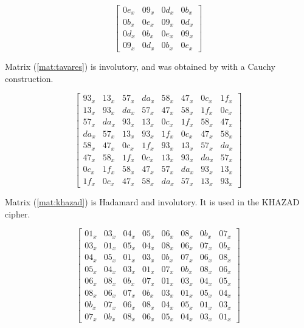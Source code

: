 \documentclass{report}
\begin{document}
\begin{equation}\label{mat:square-inv}
\begin{bmatrix}
0e_x & 09_x & 0d_x & 0b_x\\
0b_x & 0e_x & 09_x & 0d_x\\
0d_x & 0b_x & 0e_x & 09_x\\
09_x & 0d_x & 0b_x & 0e_x
\end{bmatrix}
\end{equation}

Matrix (\ref{mat:tavares}) is involutory, and was obtained by \cite{Youssef1997} with a Cauchy construction.

\begin{equation}\label{mat:tavares}
\begin{bmatrix}
93_x & 13_x & 57_x & da_x & 58_x & 47_x & 0c_x & 1f_x\\
13_x & 93_x & da_x & 57_x & 47_x & 58_x & 1f_x & 0c_x\\
57_x & da_x & 93_x & 13_x & 0c_x & 1f_x & 58_x & 47_x\\
da_x & 57_x & 13_x & 93_x & 1f_x & 0c_x & 47_x & 58_x\\
58_x & 47_x & 0c_x & 1f_x & 93_x & 13_x & 57_x & da_x\\
47_x & 58_x & 1f_x & 0c_x & 13_x & 93_x & da_x & 57_x\\
0c_x & 1f_x & 58_x & 47_x & 57_x & da_x & 93_x & 13_x\\
1f_x & 0c_x & 47_x & 58_x & da_x & 57_x & 13_x & 93_x
\end{bmatrix}
\end{equation}

Matrix (\ref{mat:khazad}) is Hadamard and involutory. It is used in the KHAZAD \cite{KHAZAD2000} cipher.

\begin{equation}\label{mat:khazad}
\begin{bmatrix}
01_x & 03_x & 04_x & 05_x & 06_x & 08_x & 0b_x & 07_x\\
03_x & 01_x & 05_x & 04_x & 08_x & 06_x & 07_x & 0b_x\\
04_x & 05_x & 01_x & 03_x & 0b_x & 07_x & 06_x & 08_x\\
05_x & 04_x & 03_x & 01_x & 07_x & 0b_x & 08_x & 06_x\\
06_x & 08_x & 0b_x & 07_x & 01_x & 03_x & 04_x & 05_x\\
08_x & 06_x & 07_x & 0b_x & 03_x & 01_x & 05_x & 04_x\\
0b_x & 07_x & 06_x & 08_x & 04_x & 05_x & 01_x & 03_x\\
07_x & 0b_x & 08_x & 06_x & 05_x & 04_x & 03_x & 01_x
\end{bmatrix}
\end{equation}
\end{document}
